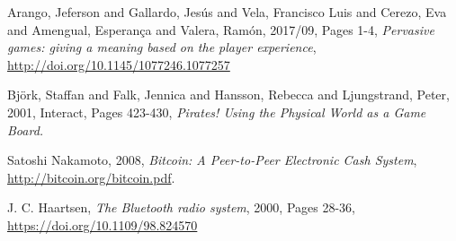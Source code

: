 %
%
%
\begin{thebibliography}{1}

  Arango, Jeferson and Gallardo, Jesús and Vela, Francisco Luis and Cerezo, Eva 
and Amengual, Esperança and Valera, Ramón,
  2017/09,
  Pages 1-4,
  \emph{Pervasive games: giving a meaning based on the player experience},
  \url{http://doi.org/10.1145/1077246.1077257}
  
  Bj{\"o}rk, Staffan and Falk, Jennica and Hansson, Rebecca and Ljungstrand, 
Peter,
  2001,
  Interact, Pages 423-430,
  \emph{Pirates! Using the Physical World as a Game Board.}
  
  Satoshi Nakamoto,
  2008,
  \emph{Bitcoin: A Peer-to-Peer Electronic Cash System},
  \url{http://bitcoin.org/bitcoin.pdf}.
  
  J. C. Haartsen,
  \emph{The Bluetooth radio system},
  2000,
  Pages 28-36,
  \url{https://doi.org/10.1109/98.824570}

\end{thebibliography}
